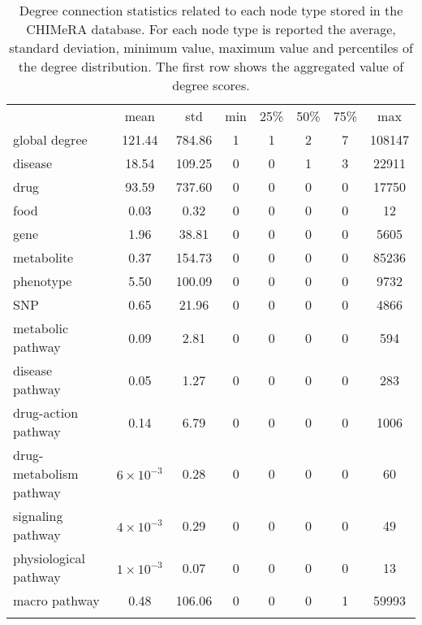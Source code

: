 \documentclass{standalone}
\begin{document}
\begin{table}
\centering
\begin{tabular}{lccccccc}
\hline\rowcolor{darkgrayrow}
                        & mean            &  std    &  min & 25\% & 50\% & 75\% &   max  \\
global degree           & 121.44          &  784.86 &    1 &    1 &    2 &    7 & 108147 \\
disease                 &  18.54          &  109.25 &    0 &    0 &    1 &    3 &  22911 \\
drug                    &  93.59          &  737.60 &    0 &    0 &    0 &    0 &  17750 \\
food                    &   0.03          &    0.32 &    0 &    0 &    0 &    0 &     12 \\
gene                    &   1.96          &   38.81 &    0 &    0 &    0 &    0 &   5605 \\
metabolite              &   0.37          &  154.73 &    0 &    0 &    0 &    0 &  85236 \\
phenotype               &   5.50          &  100.09 &    0 &    0 &    0 &    0 &   9732 \\
SNP                     &   0.65          &   21.96 &    0 &    0 &    0 &    0 &   4866 \\
metabolic pathway       &   0.09          &    2.81 &    0 &    0 &    0 &    0 &    594 \\
disease pathway         &   0.05          &    1.27 &    0 &    0 &    0 &    0 &    283 \\
drug-action pathway     &   0.14          &    6.79 &    0 &    0 &    0 &    0 &   1006 \\
drug-metabolism pathway &$6\times10^{-3}$ &    0.28 &    0 &    0 &    0 &    0 &     60 \\
signaling pathway       &$4\times10^{-3}$ &    0.29 &    0 &    0 &    0 &    0 &     49 \\
physiological pathway   &$1\times10^{-3}$ &    0.07 &    0 &    0 &    0 &    0 &     13 \\
macro pathway           &   0.48          &  106.06 &    0 &    0 &    0 &    1 &  59993 \\
\hline\\
\end{tabular}
\caption{Degree connection statistics related to each node type stored in the \textsf{CHIMeRA} database.
For each node type is reported the average, standard deviation, minimum value, maximum value and percentiles of the degree distribution.
The first row shows the aggregated value of degree scores.
}
\label{tab:chimera_degree}
\end{table}
\end{document}
